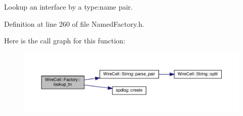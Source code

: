 Lookup an interface by a type\+:name pair. 



Definition at line 260 of file Named\+Factory.\+h.

Here is the call graph for this function\+:
\nopagebreak
\begin{figure}[H]
\begin{center}
\leavevmode
\includegraphics[width=350pt]{namespace_wire_cell_1_1_factory_acde6688421b73bf10a0d26e77c9330c2_cgraph}
\end{center}
\end{figure}
